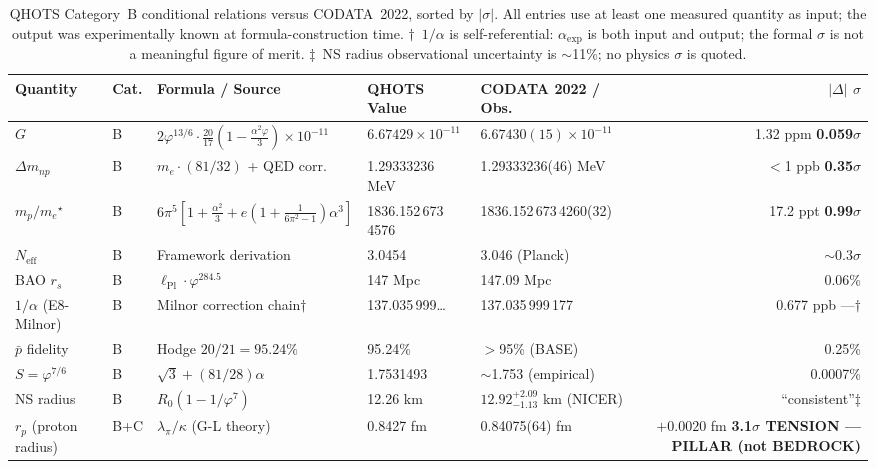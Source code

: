 \documentclass[aps,prd,twocolumn,superscriptaddress,floatfix,nofootinbib]{revtex4-2}
\theoremstyle{definition}
\theoremstyle{remark}
\newcommand{\vp}{\varphi}
\begin{document}
\begin{table}[ht]
\centering
\caption{%
  QHOTS Category~B conditional relations versus CODATA~2022, sorted by $|\sigma|$.
  All entries use at least one measured quantity as input; the output was experimentally known
  at formula-construction time.
  $\dagger$~$1/\alpha$ is self-referential: $\alpha_\text{exp}$ is both input and output;
  the formal $\sigma$ is not a meaningful figure of merit.
  $\ddagger$~NS radius observational uncertainty is $\sim$11\%; no physics $\sigma$ is quoted.
}
\label{tab:sigma_codata2022}
\small
\begin{tabular}{p{2.6cm}lp{4.4cm}llr}
\toprule
Quantity &
Cat. &
Formula / Source &
QHOTS Value &
CODATA 2022 / Obs. &
$|\Delta|$ \quad $\sigma$ \\
\midrule
$G$ &
B &
$2\vp^{13/6}\cdot\tfrac{20}{17}(1-\tfrac{\alpha^2\vp}{3})\times10^{-11}$ &
$6.67429\times10^{-11}$ &
$6.67430(15)\times10^{-11}$ &
1.32 ppm \quad \textbf{0.059$\sigma$} \\

$\Delta m_{np}$ &
B &
$m_e\cdot(81/32)$ + QED corr. &
1.29333236 MeV &
1.29333236(46) MeV &
$<$1 ppb \quad \textbf{0.35$\sigma$} \\

$m_p/m_e$$^{\star}$ &
B &
$6\pi^5[1+\tfrac{\alpha^2}{3}+e(1+\tfrac{1}{6\pi^2-1})\alpha^3]$ &
1836.152\,673\,4576 &
1836.152\,673\,4260(32) &
17.2 ppt \quad \textbf{0.99$\sigma$} \\

$N_\text{eff}$ &
B &
Framework derivation &
3.0454 &
3.046 (Planck) &
$\sim$0.3$\sigma$ \\

BAO $r_s$ &
B &
$\ell_\text{Pl}\cdot\vp^{284.5}$ &
147 Mpc &
147.09 Mpc &
0.06\% \\

$1/\alpha$ (E8-Milnor) &
B &
Milnor correction chain$\dagger$ &
137.035\,999\ldots &
137.035\,999\,177 &
0.677 ppb \quad ---$\dagger$ \\

$\bar{p}$ fidelity &
B &
Hodge $20/21 = 95.24\%$ &
95.24\% &
$>$95\% (BASE) &
0.25\% \\

$S = \vp^{7/6}$ &
B &
$\sqrt{3}+(81/28)\alpha$ &
1.7531493 &
$\sim$1.753 (empirical) &
0.0007\% \\

NS radius &
B &
$R_0(1-1/\vp^7)$ &
12.26 km &
$12.92^{+2.09}_{-1.13}$ km (NICER) &
``consistent''$\ddagger$ \\

\midrule
\rowcolor{red!10}
$r_p$ (proton radius) &
B+C &
$\lambda_\pi/\kappa$ (G-L theory) &
0.8427 fm &
0.84075(64) fm &
$+0.0020$ fm \quad \textbf{3.1$\sigma$ TENSION --- PILLAR (not BEDROCK)} \\
\bottomrule
\end{tabular}
\end{table}
\end{document}
